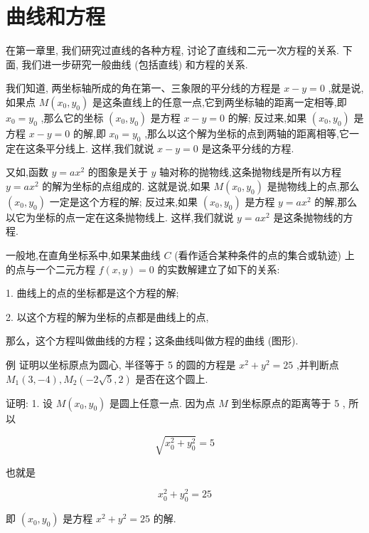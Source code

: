 \documentclass[lang=cn,newtx,10.5pt,scheme=chinese]{elegantbook}
\begin{document}
\section{曲线和方程}

在第一章里, 我们研究过直线的各种方程, 讨论了直线和二元一次方程的关系. 下面, 我们进一步研究一般曲线 (包括直线) 和方程的关系.

我们知道, 两坐标轴所成的角在第一、三象限的平分线的方程是 \(x - y = 0\) ,就是说,如果点 \(M\left( {{x}_{0},{y}_{0}}\right)\) 是这条直线上的任意一点,它到两坐标轴的距离一定相等,即 \({x}_{0} = {y}_{0}\) ,那么它的坐标 \(\left( {{x}_{0},{y}_{0}}\right)\) 是方程 \(x - y = 0\) 的解; 反过来,如果 \(\left( {{x}_{0},{y}_{0}}\right)\) 是方程 \(x - y = 0\) 的解,即 \({x}_{0} = {y}_{0}\) ,那么以这个解为坐标的点到两轴的距离相等,它一定在这条平分线上. 这样,我们就说 \(x - y = 0\) 是这条平分线的方程.

又如,函数 \(y = a{x}^{2}\) 的图象是关于 \(y\) 轴对称的抛物线,这条抛物线是所有以方程 \(y = a{x}^{2}\) 的解为坐标的点组成的. 这就是说,如果 \(M\left( {{x}_{0},{y}_{0}}\right)\) 是抛物线上的点,那么 \(\left( {{x}_{0},{y}_{0}}\right)\) 一定是这个方程的解; 反过来,如果 \(\left( {{x}_{0},{y}_{0}}\right)\) 是方程 \(y = a{x}^{2}\) 的解,那么以它为坐标的点一定在这条抛物线上. 这样,我们就说 \(y = a{x}^{2}\) 是这条抛物线的方程.


\begin{corollary}[曲线和方程的关系]	
一般地,在直角坐标系中,如果某曲线 \(C\) (看作适合某种条件的点的集合或轨迹) 上的点与一个二元方程 \(f\left( {x,y}\right) = 0\) 的实数解建立了如下的关系:

1. 曲线上的点的坐标都是这个方程的解;

2. 以这个方程的解为坐标的点都是曲线上的点,

那么，这个方程叫做曲线的方程；这条曲线叫做方程的曲线 (图形).
\end{corollary}
例 证明以坐标原点为圆心, 半径等于 5 的圆的方程是 \({x}^{2} + {y}^{2} = {25}\) ,并判断点 \({M}_{1}\left( {3, - 4}\right) ,{M}_{2}\left( {-2\sqrt{5},2}\right)\) 是否在这个圆上.

证明: 1. 设 \(M\left( {{x}_{0},{y}_{0}}\right)\) 是圆上任意一点. 因为点 \(M\) 到坐标原点的距离等于 5 , 所以

\[
  \sqrt{{x}_{0}^{2} + {y}_{0}^{2}} = 5
\]

也就是

\[
    {x}_{0}^{2} + {y}_{0}^{2} = {25}
\]

即 \(\left( {{x}_{0},{y}_{0}}\right)\) 是方程 \({x}^{2} + {y}^{2} = {25}\) 的解.
\end{document}
